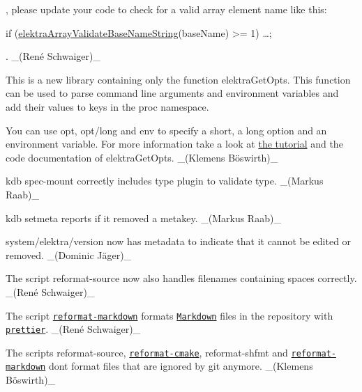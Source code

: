 , please update your code to check for a valid array element name like this\+:


\begin{DoxyCode}
\textcolor{keywordflow}{if} (\hyperlink{array_8c_ab2eb25a64ded91feb47e58af8e62314a}{elektraArrayValidateBaseNameString}(baseName) >= 1) …;
\end{DoxyCode}


. \+\_\+(René Schwaiger)\+\_\+


\begin{DoxyItemize}
\item This is a new library containing only the function {\ttfamily elektra\+Get\+Opts}. This function can be used to parse command line arguments and environment variables and add their values to keys in the proc namespace.

You can use {\ttfamily opt}, {\ttfamily opt/long} and {\ttfamily env} to specify a short, a long option and an environment variable. For more information take a look at \hyperlink{doc_tutorials_command-line-options_md}{the tutorial} and the code documentation of {\ttfamily elektra\+Get\+Opts}. \+\_\+(Klemens Böswirth)\+\_\+
\end{DoxyItemize}


\begin{DoxyItemize}
\item {\ttfamily kdb spec-\/mount} correctly includes type plugin to validate {\ttfamily type}. \+\_\+(\+Markus Raab)\+\_\+
\item {\ttfamily kdb setmeta} reports if it removed a metakey. \+\_\+(\+Markus Raab)\+\_\+
\item {\ttfamily system/elektra/version} now has metadata to indicate that it cannot be edited or removed. \+\_\+(Dominic Jäger)\+\_\+
\end{DoxyItemize}


\begin{DoxyItemize}
\item The script {\ttfamily reformat-\/source} now also handles filenames containing spaces correctly. \+\_\+(René Schwaiger)\+\_\+
\item The script \href{https://master.libelektra.org/scripts/dev/reformat-markdown}{\tt {\ttfamily reformat-\/markdown}} formats \href{https://daringfireball.net/projects/markdown}{\tt Markdown} files in the repository with \href{https://prettier.io}{\tt {\ttfamily prettier}}. \+\_\+(René Schwaiger)\+\_\+
\item The scripts {\ttfamily reformat-\/source}, \href{https://master.libelektra.org/scripts/dev/reformat-cmake}{\tt {\ttfamily reformat-\/cmake}}, {\ttfamily reformat-\/shfmt} and \href{https://master.libelektra.org/scripts/dev/reformat-markdown}{\tt {\ttfamily reformat-\/markdown}} don\textquotesingle{}t format files that are ignored by git anymore. \+\_\+(Klemens Böswirth)\+\_\+
\end{DoxyItemize}


